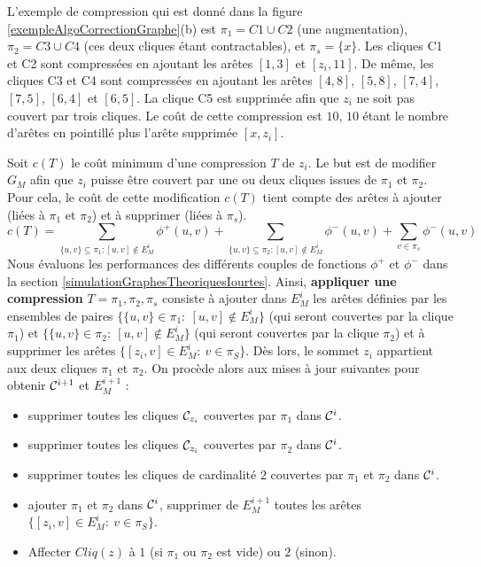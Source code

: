 L'exemple de compression qui est donn\'e dans la figure \ref{exempleAlgoCorrectionGraphe}(b) est $\pi_1 = C1 \cup C2$ (une augmentation), $\pi_2 = C3 \cup C4$ (ces deux cliques \'etant contractables), et $\pi_s = \{x\}$.
Les cliques C1 et C2 sont compress\'ees en ajoutant les ar\^etes $[1,3]$ et $[z_i,11]$. De m\^eme, les cliques C3 et C4 sont compress\'ees en ajoutant les ar\^etes  $[4,8]$, $[5,8]$, $[7,4]$, $[7,5]$, $[6,4]$ et $[6,5]$. La clique C5 est supprim\'ee afin que $z_i$ ne soit pas couvert par trois cliques.
Le co\^ut  de cette compression est $10$, $10$ \'etant le nombre d'ar\^etes en pointill\'e plus l'ar\^ete supprim\'ee $[x,z_i]$.
\newline

Soit  $c(T)$ le co\^ut minimum d'une compression $T$ de $z_i$.
Le but est de modifier $G_M$ afin que $z_i$ puisse \^etre couvert par une ou deux cliques issues de $\pi_1$ et $\pi_2$.
Pour cela, le co\^ut de cette modification $c(T)$ tient compte des ar\^etes \`a ajouter (li\'ees \`a $\pi_1$ et $\pi_2$) et \`a supprimer (li\'ees \`a $\pi_s$).
\begin{equation}
c(T) = \sum_{ \{u,v\} \subseteq \pi_1: [u,v] \notin E_M^i } \phi^{+}(u,v) + \sum_{ \{u,v\} \subseteq \pi_2: [u,v] \notin E_M^i } \phi^{-}(u,v) + \sum_{ v \in \pi_s } \phi^{-}(u,v)
\end{equation}
Nous \'evaluons les performances des diff\'erents couples de fonctions $\phi^{+}$ et $\phi^{-}$ dans la section \ref{simulationGraphesTheoriquesIourtes}.
\newline
Ainsi, {\bf appliquer une compression} $T = \pi_1, \pi_2, \pi_s$ consiste \`a ajouter dans $E_M^i$ les ar\^etes d\'efinies par les ensembles de paires $\{\{u,v\} \in \pi_1:~[u,v]\not\in E_{M}^{i}\}$ (qui seront couvertes par la clique $\pi_1$) et $\{\{u,v\} \in \pi_2:~[u,v]\not\in  E_{M}^{i}\}$ (qui seront couvertes par la clique $\pi_2$) et \`a supprimer les ar\^etes $\{[z_i,v] \in  E_{M}^{i}:~v\in \pi_S\}$. 
\newline
D\`es lors, le sommet $z_i$ appartient aux deux cliques $\pi_1$ et $\pi_2$.
On proc\`ede alors aux mises \`a jour suivantes pour obtenir ${\cal C}^{i+1}$ et $E_M^{i+1}$ :
\begin{itemize}
\item supprimer toutes les cliques ${\cal C}_{z_i}$ couvertes par $\pi_1$ dans  ${\cal C}^{i}$.
\item supprimer toutes les cliques ${\cal C}_{z_i}$ couvertes par $\pi_2$ dans  ${\cal C}^{i}$.
\item supprimer toutes les cliques de cardinalit\'e $2$ couvertes par $\pi_1$ et $\pi_2$ dans  ${\cal C}^{i}$.
\item ajouter $\pi_1$ et $\pi_2$ dans ${\cal C}^{i}$, supprimer de $E_M^{i+1}$ toutes les ar\^etes  $\{[z_i,v] \in E_M^{i}:~v\in \pi_S\}$.
\item Affecter $Cliq(z)$ \`a $1$ (si $\pi_1$  ou $\pi_2$ est vide) ou $2$ (sinon).
\end{itemize}
